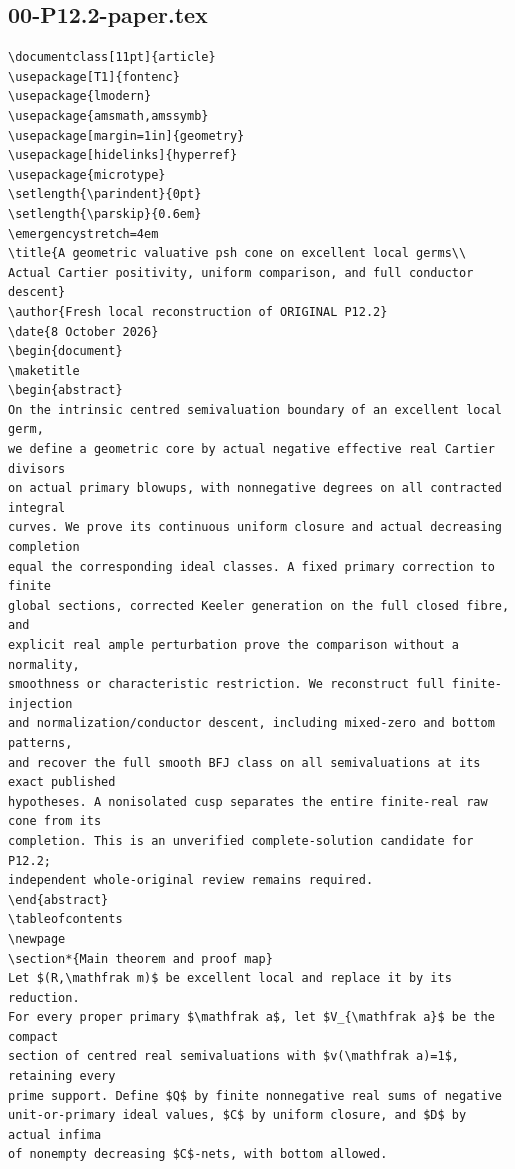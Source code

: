 \documentclass[11pt]{article}
\begin{document}
\subsection{00-P12.2-paper.tex}
\begin{Verbatim}[fontsize=\tiny,breaklines=true,breakanywhere=true]
\documentclass[11pt]{article}
\usepackage[T1]{fontenc}
\usepackage{lmodern}
\usepackage{amsmath,amssymb}
\usepackage[margin=1in]{geometry}
\usepackage[hidelinks]{hyperref}
\usepackage{microtype}
\setlength{\parindent}{0pt}
\setlength{\parskip}{0.6em}
\emergencystretch=4em
\title{A geometric valuative psh cone on excellent local germs\\
Actual Cartier positivity, uniform comparison, and full conductor descent}
\author{Fresh local reconstruction of ORIGINAL P12.2}
\date{8 October 2026}
\begin{document}
\maketitle
\begin{abstract}
On the intrinsic centred semivaluation boundary of an excellent local germ,
we define a geometric core by actual negative effective real Cartier divisors
on actual primary blowups, with nonnegative degrees on all contracted integral
curves. We prove its continuous uniform closure and actual decreasing completion
equal the corresponding ideal classes. A fixed primary correction to finite
global sections, corrected Keeler generation on the full closed fibre, and
explicit real ample perturbation prove the comparison without a normality,
smoothness or characteristic restriction. We reconstruct full finite-injection
and normalization/conductor descent, including mixed-zero and bottom patterns,
and recover the full smooth BFJ class on all semivaluations at its exact published
hypotheses. A nonisolated cusp separates the entire finite-real raw cone from its
completion. This is an unverified complete-solution candidate for P12.2;
independent whole-original review remains required.
\end{abstract}
\tableofcontents
\newpage
\section*{Main theorem and proof map}
Let $(R,\mathfrak m)$ be excellent local and replace it by its reduction.
For every proper primary $\mathfrak a$, let $V_{\mathfrak a}$ be the compact
section of centred real semivaluations with $v(\mathfrak a)=1$, retaining every
prime support. Define $Q$ by finite nonnegative real sums of negative
unit-or-primary ideal values, $C$ by uniform closure, and $D$ by actual infima
of nonempty decreasing $C$-nets, with bottom allowed.


\end{Verbatim}
\end{document}
